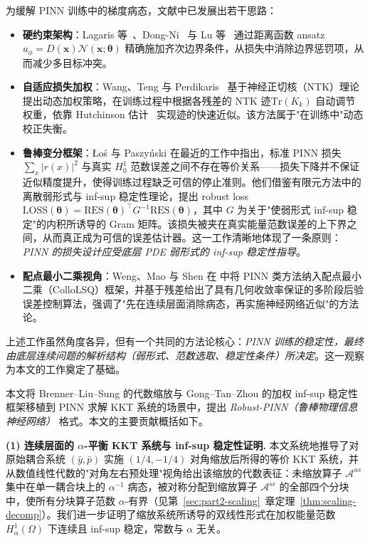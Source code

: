 \documentclass{xmu}
\theoremstyle{plain}
\theoremstyle{remark}
\begin{document}
为缓解 PINN 训练中的梯度病态，文献中已发展出若干思路：
\begin{itemize}
  \item \textbf{硬约束架构}：Lagaris 等~\cite{23}、Dong-Ni~\cite{24} 与 Lu 等~\cite{16} 通过距离函数 ansatz $u_\phi = D(\mathbf{x})\mathcal{N}(\mathbf{x};\boldsymbol{\theta})$ 精确施加齐次边界条件，从损失中消除边界惩罚项，从而减少多目标冲突。
  \item \textbf{自适应损失加权}：Wang、Teng 与 Perdikaris~\cite{27,29} 基于神经正切核（NTK）理论提出动态加权策略，在训练过程中根据各残差的 NTK 迹$\mathrm{Tr}(K_k)$ 自动调节权重，依靠 Hutchinson 估计~\cite{30} 实现迹的快速近似。该方法属于"在训练中"动态校正失衡。
  \item \textbf{鲁棒变分框架}：Łoś 与 Paszyński 在最近的工作中指出，标准 PINN 损失 $\sum_x|r(x)|^2$ 与真实 $H_0^1$ 范数误差之间不存在等价关系——损失下降并不保证近似精度提升，使得训练过程缺乏可信的停止准则。他们借鉴有限元方法中的离散弱形式与 inf-sup 稳定性理论，提出 robust loss $\mathrm{LOSS}(\boldsymbol{\theta}) = \mathrm{RES}(\boldsymbol{\theta})^\top G^{-1}\mathrm{RES}(\boldsymbol{\theta})$，其中 $G$ 为关于"使弱形式 inf-sup 稳定"的内积所诱导的 Gram 矩阵。该损失被夹在真实能量范数误差的上下界之间，从而真正成为可信的误差估计器。这一工作清晰地体现了一条原则：\emph{PINN 的损失设计应受底层 PDE 弱形式的 inf-sup 稳定性指导}。
  \item \textbf{配点最小二乘视角}：Weng、Mao 与 Shen 在 \cite{5} 中将 PINN 类方法纳入配点最小二乘（ColloLSQ）框架，并基于残差给出了具有几何收敛率保证的多阶段后验误差控制算法，强调了"先在连续层面消除病态，再实施神经网络近似"的方法论。
\end{itemize}

上述工作虽然角度各异，但有一个共同的方法论核心：\emph{PINN 训练的稳定性，最终由底层连续问题的解析结构（弱形式、范数选取、稳定性条件）所决定}。这一观察为本文的工作奠定了基础。

\label{subsec:intro-contrib}

本文将 Brenner--Liu--Sung 的代数缩放与 Gong--Tan--Zhou 的加权 inf-sup 稳定性框架移植到 PINN 求解 KKT 系统的场景中，提出 \emph{Robust-PINN（鲁棒物理信息神经网络）} 格式。本文的主要贡献概括如下。

\textbf{(1) 连续层面的 $\alpha$-平衡 KKT 系统与 inf-sup 稳定性证明.}
本文系统地推导了对原始耦合系统 $(\bar y,\bar p)$ 实施 $(1/4,-1/4)$ 对角缩放后所得的等价 KKT 系统，并从数值线性代数的"对角左右预处理"视角给出该缩放的代数表征：未缩放算子 $\mathcal{A}^{us}$ 集中在单一耦合块上的 $\alpha^{-1}$ 病态，被对称分配到缩放算子 $\mathcal{A}^{sc}$ 的全部四个分块中，使所有分块算子范数 $\alpha$-有界（见第~\ref{sec:part2-scaling}~章定理~\ref{thm:scaling-decomp}）。我们进一步证明了缩放系统所诱导的双线性形式在加权能量范数 $H_\alpha^1(\Omega)$ 下连续且 inf-sup 稳定，常数与 $\alpha$ 无关。
\end{document}
